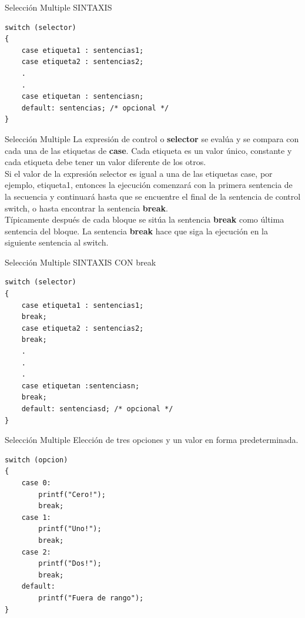 \begin{frame}[fragile]{Selección Multiple}
\centering
{\LARGE SINTAXIS}
    \begin{lstlisting}
switch (selector)
{
    case etiqueta1 : sentencias1;
    case etiqueta2 : sentencias2;
    .
    .
    case etiquetan : sentenciasn;
    default: sentencias; /* opcional */
}
\end{lstlisting}
\end{frame}


\begin{frame}[t]{Selección Multiple}
\hspace{5mm}La expresión de control o \textbf{selector} se evalúa y se compara con cada una de las etiquetas de \textbf{case}. Cada etiqueta es un valor único, constante y cada etiqueta debe tener un valor diferente de los otros.\\
\hspace{5mm}Si el valor de la expresión selector es igual a una de las etiquetas case, por ejemplo, etiqueta1, entonces
la ejecución comenzará con la primera sentencia de la secuencia y continuará hasta que se encuentre el final de la sentencia de control switch, o hasta encontrar la sentencia \textbf{break}.\\
\hspace{5mm}Típicamente después de cada bloque se sitúa la sentencia \textbf{break }como última sentencia del bloque. La sentencia \textbf{break} hace que siga la ejecución en la siguiente sentencia al switch.
\end{frame}


\begin{frame}[c,fragile]{Selección Multiple}
\centering
SINTAXIS CON break
\begin{lstlisting}
switch (selector)
{
    case etiqueta1 : sentencias1;
    break;
    case etiqueta2 : sentencias2;
    break;
    .
    .
    .
    case etiquetan :sentenciasn;
    break;
    default: sentenciasd; /* opcional */
}
\end{lstlisting}
\end{frame}


\begin{frame}[c,fragile]{Selección Multiple}
\centering
Elección de tres opciones y un valor en forma predeterminada.
\begin{lstlisting}
switch (opcion)
{
    case 0:
        printf("Cero!");
        break;
    case 1:
        printf("Uno!");
        break;
    case 2:
        printf("Dos!");
        break;
    default:
        printf("Fuera de rango");
}
\end{lstlisting}
\end{frame}


